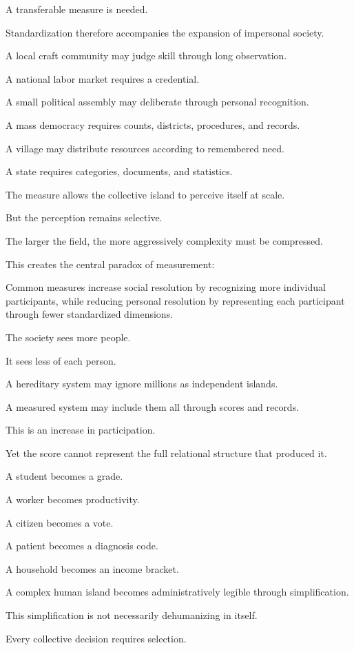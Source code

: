 A transferable measure is needed.

Standardization therefore accompanies the expansion of impersonal society.

A local craft community may judge skill through long observation.

A national labor market requires a credential.

A small political assembly may deliberate through personal recognition.

A mass democracy requires counts, districts, procedures, and records.

A village may distribute resources according to remembered need.

A state requires categories, documents, and statistics.

The measure allows the collective island to perceive itself at scale.

But the perception remains selective.

The larger the field, the more aggressively complexity must be compressed.

This creates the central paradox of measurement:

Common measures increase social resolution by recognizing more individual participants, while reducing personal resolution by representing each participant through fewer standardized dimensions.

The society sees more people.

It sees less of each person.

A hereditary system may ignore millions as independent islands.

A measured system may include them all through scores and records.

This is an increase in participation.

Yet the score cannot represent the full relational structure that produced it.

A student becomes a grade.

A worker becomes productivity.

A citizen becomes a vote.

A patient becomes a diagnosis code.

A household becomes an income bracket.

A complex human island becomes administratively legible through simplification.

This simplification is not necessarily dehumanizing in itself.

Every collective decision requires selection.

